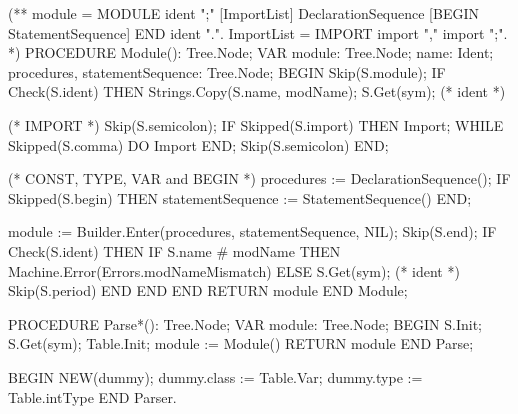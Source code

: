 \documentclass[utf8]{lgu}
\begin{document}
\begin{modula2long}
(** module = MODULE ident ";" [ImportList]
    DeclarationSequence [BEGIN StatementSequence] END ident ".".
     ImportList = IMPORT import {"," import} ";". *)
PROCEDURE Module(): Tree.Node;
VAR module: Tree.Node;
  name: Ident;
  procedures, statementSequence: Tree.Node;
BEGIN
  Skip(S.module);
  IF Check(S.ident) THEN
    Strings.Copy(S.name, modName);
    S.Get(sym); (* ident *)

    (* IMPORT *)
    Skip(S.semicolon);
    IF Skipped(S.import) THEN
      Import;
      WHILE Skipped(S.comma) DO
        Import
      END;
      Skip(S.semicolon)
    END;

    (* CONST, TYPE, VAR and BEGIN *)
    procedures := DeclarationSequence();
    IF Skipped(S.begin) THEN
      statementSequence := StatementSequence()
    END;

    module := Builder.Enter(procedures, statementSequence, NIL);
    Skip(S.end);
    IF Check(S.ident) THEN
      IF S.name # modName THEN
        Machine.Error(Errors.modNameMismatch)
      ELSE
        S.Get(sym); (* ident *)
        Skip(S.period)
      END
    END
  END
RETURN module END Module;

PROCEDURE Parse*(): Tree.Node;
VAR module: Tree.Node;
BEGIN
  S.Init;
  S.Get(sym);
  Table.Init;
  module := Module()
RETURN module END Parse;

BEGIN
  NEW(dummy);
  dummy.class := Table.Var;
  dummy.type := Table.intType
END Parser.
\end{modula2long}
\end{document}
